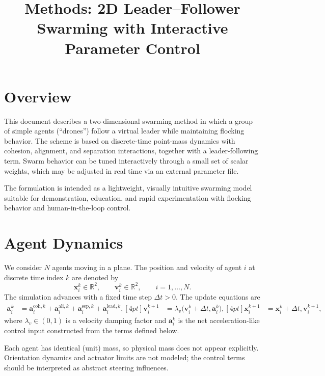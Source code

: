 \documentclass[12pt]{article}
\title{Methods: 2D Leader--Follower Swarming with Interactive Parameter Control}
\author{}
\date{}
\begin{document}
\maketitle

\section{Overview}
This document describes a two-dimensional swarming method in which a group of simple agents (``drones'') follow a virtual leader while maintaining flocking behavior. The scheme is based on discrete-time point-mass dynamics with cohesion, alignment, and separation interactions, together with a leader-following term. Swarm behavior can be tuned interactively through a small set of scalar weights, which may be adjusted in real time via an external parameter file.

The formulation is intended as a lightweight, visually intuitive swarming model suitable for demonstration, education, and rapid experimentation with flocking behavior and human-in-the-loop control.

\section{Agent Dynamics}
We consider $N$ agents moving in a plane. The position and velocity of agent $i$ at discrete time index $k$ are denoted by
\begin{equation}
\mathbf{x}_i^k \in \mathbb{R}^2, \qquad \mathbf{v}_i^k \in \mathbb{R}^2, \qquad i = 1,\dots,N.
\end{equation}
The simulation advances with a fixed time step $\Delta t > 0$. The update equations are
\begin{align}
\mathbf{a}_i^k &= \mathbf{a}_i^{\mathrm{coh},k} + \mathbf{a}_i^{\mathrm{ali},k} + \mathbf{a}_i^{\mathrm{sep},k} + \mathbf{a}_i^{\mathrm{lead},k}, [4pt]
\mathbf{v}_i^{k+1} &= \lambda_v \bigl(\mathbf{v}_i^k + \Delta t, \mathbf{a}_i^k\bigr), [4pt]
\mathbf{x}_i^{k+1} &= \mathbf{x}_i^k + \Delta t, \mathbf{v}_i^{k+1},
\end{align}
where $\lambda_v \in (0,1)$ is a velocity damping factor and $\mathbf{a}_i^k$ is the net acceleration-like control input constructed from the terms defined below.

Each agent has identical (unit) mass, so physical mass does not appear explicitly. Orientation dynamics and actuator limits are not modeled; the control terms should be interpreted as abstract steering influences.
\end{document}
